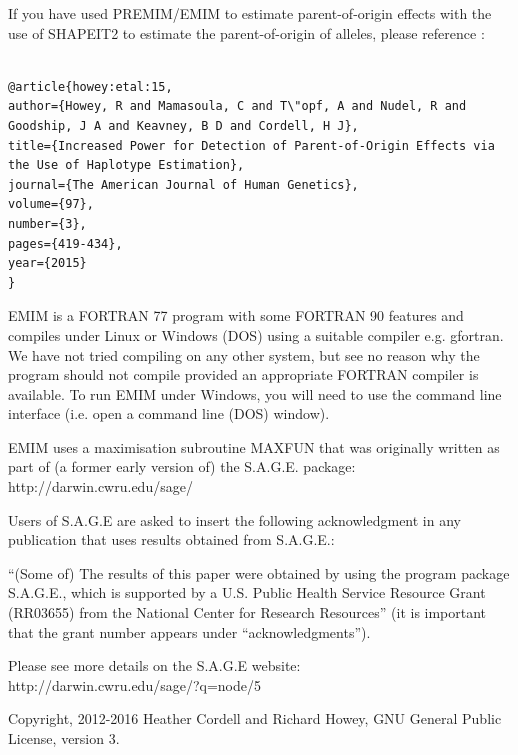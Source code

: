 \documentclass[a4paper,12pt]{article}
\begin{document}
If you have used PREMIM/EMIM to estimate parent-of-origin effects with the use of SHAPEIT2 to estimate the parent-of-origin of alleles, please reference \citet{howey:etal:15}: 
\vspace{0.35cm} \begin{lstlisting}

@article{howey:etal:15,
author={Howey, R and Mamasoula, C and T\"opf, A and Nudel, R and Goodship, J A and Keavney, B D and Cordell, H J},
title={Increased Power for Detection of Parent-of-Origin Effects via the Use of Haplotype Estimation},
journal={The American Journal of Human Genetics},
volume={97},
number={3},
pages={419-434},
year={2015}
}

\end{lstlisting} \vspace{0.35cm}
EMIM is a FORTRAN 77 program with some FORTRAN 90 features and compiles under Linux or Windows (DOS) using a suitable compiler e.g. gfortran. We have not tried compiling on any other system, but see no reason why the program should not compile provided an appropriate FORTRAN compiler is available. To run EMIM under Windows, you will need to use the command line interface (i.e. open a command line (DOS) window). 

EMIM uses a maximisation subroutine MAXFUN that was originally written as part of (a former early version of) the S.A.G.E. package: \\ http://darwin.cwru.edu/sage/

Users of S.A.G.E are asked to insert the following acknowledgment in any publication that uses results obtained from S.A.G.E.: 

``(Some of) The results of this paper were obtained by using the program package S.A.G.E., which is supported by a U.S. Public Health Service Resource Grant (RR03655) from the National Center for Research Resources'' (it is important that the grant number appears under ``acknowledgments''). 

Please see more details on the S.A.G.E website: \\ http://darwin.cwru.edu/sage/?q=node/5

Copyright, 2012-2016 Heather Cordell and Richard Howey, GNU General Public License, version 3. 



\end{document}
